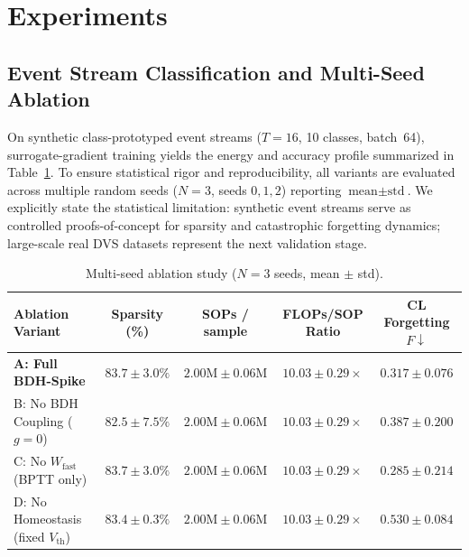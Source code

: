 \documentclass[11pt]{article}
\newcommand{\Wfast}{W_{\text{fast}}}
\begin{document}
\section{Experiments}
\subsection{Event Stream Classification and Multi-Seed Ablation}
On synthetic class-prototyped event streams ($T{=}16$, 10 classes,
batch~64), surrogate-gradient training yields the energy and accuracy
profile summarized in Table~\ref{tab:ablation}. To ensure statistical
rigor and reproducibility, all variants are evaluated across multiple random seeds
($N=3$, seeds $0, 1, 2$) reporting $\text{mean} \pm \text{std}$.
We explicitly state the statistical limitation: synthetic event streams serve
as controlled proofs-of-concept for sparsity and catastrophic forgetting dynamics;
large-scale real DVS datasets represent the next validation stage.

\begin{table}[h]
\centering
\caption{Multi-seed ablation study ($N=3$ seeds, mean $\pm$ std).}
\label{tab:ablation}
\begin{small}
\begin{tabular}{lcccc}
\toprule
Ablation Variant & Sparsity (\%) & SOPs / sample & FLOPs/SOP Ratio & CL Forgetting $F \downarrow$ \\
\midrule
\textbf{A: Full BDH-Spike} & $\mathbf{83.7 \pm 3.0\%}$ & $2.00\text{M} \pm 0.06\text{M}$ & $\mathbf{10.03 \pm 0.29\times}$ & $\mathbf{0.317 \pm 0.076}$ \\
B: No BDH Coupling ($g=0$) & $82.5 \pm 7.5\%$ & $2.00\text{M} \pm 0.06\text{M}$ & $10.03 \pm 0.29\times$ & $0.387 \pm 0.200$ \\
C: No $\Wfast$ (BPTT only) & $83.7 \pm 3.0\%$ & $2.00\text{M} \pm 0.06\text{M}$ & $10.03 \pm 0.29\times$ & $0.285 \pm 0.214$ \\
D: No Homeostasis (fixed $V_{\text{th}}$) & $83.4 \pm 0.3\%$ & $2.00\text{M} \pm 0.06\text{M}$ & $10.03 \pm 0.29\times$ & $0.530 \pm 0.084$ \\
\bottomrule
\end{tabular}
\end{small}
\end{table}
\end{document}
